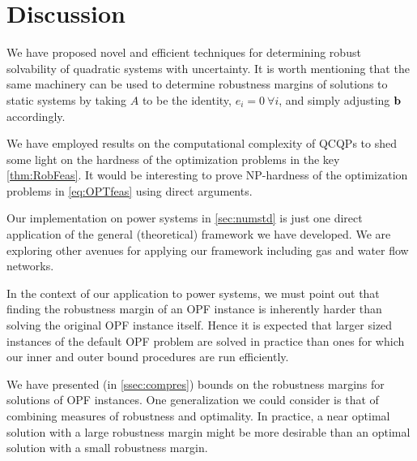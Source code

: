 \section{Discussion} \label{sec:disc}


We have proposed novel and efficient techniques for determining robust solvability of quadratic systems with uncertainty. 
It is worth mentioning that the same machinery can be used to determine robustness margins of solutions to static systems by taking $A$ to be the identity, $e_i=0 \ \forall i$, and simply adjusting $\mathbf{b}$ accordingly.

We have employed results on the computational complexity of QCQPs to shed some light on the hardness of the optimization problems in the key \cref{thm:RobFeas}.
It would be interesting to prove NP-hardness of the optimization problems in \cref{eq:OPTfeas} using direct arguments.

Our implementation on power systems in \cref{sec:numstd} is just one direct application of the general (theoretical) framework we have developed.
We are exploring other avenues for applying our framework including gas and water flow networks.

In the context of our application to power systems, we must point out that finding the robustness margin of an OPF instance is inherently harder than solving the original OPF instance itself.
Hence it is expected that larger sized instances of the default OPF problem are solved in practice than ones for which our inner and outer bound procedures are run efficiently.

We have presented (in \cref{ssec:compres}) bounds on the robustness margins for solutions of OPF instances.
One generalization we could consider is that of combining measures of robustness and optimality.
In practice, a near optimal solution with a large robustness margin might be more desirable than an optimal solution with a small robustness margin.




